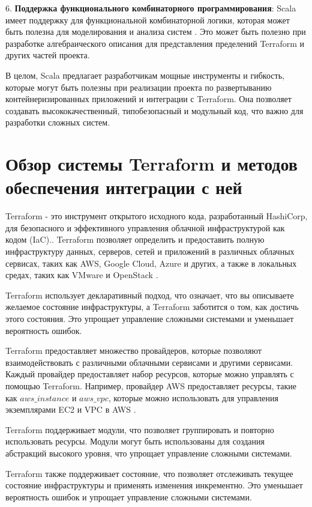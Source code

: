 6. \textbf{Поддержка функционального комбинаторного программирования}:
Scala имеет поддержку для функциональной комбинаторной логики, которая
может быть полезна для моделирования и анализа систем 
\cite{wolfengagen-combinatory-2008, wolfengagen-methods-2008}.
Это может быть полезно при разработке алгебраического описания для
представления пределений Terraform и других частей проекта.

В целом, Scala предлагает разработчикам мощные инструменты и гибкость,
которые могут быть полезны при реализации проекта по развертыванию
контейнеризированных приложений и интеграции с Terraform. Она позволяет
создавать высококачественный, типобезопасный и модульный код, что важно
для разработки сложных систем.

\section{Обзор системы Terraform и методов обеспечения интеграции с ней}

Terraform - это инструмент открытого исходного кода, разработанный HashiCorp,
для безопасного и эффективного управления облачной инфраструктурой как
кодом (IaC).\cite{jourdan2017infrastructure}. Terraform позволяет определить и
предоставить полную
инфраструктуру данных, серверов, сетей и приложений в различных облачных
сервисах, таких как AWS, Google Cloud, Azure и других, а также в локальных
средах, таких как VMware и OpenStack \cite{howard2022terraform}.

Terraform использует декларативный подход, что означает, что вы описываете
желаемое состояние инфраструктуры, а Terraform заботится о том, как достичь
этого состояния. Это упрощает управление сложными системами и уменьшает
вероятность ошибок.

Terraform предоставляет множество провайдеров, которые позволяют
взаимодействовать с различными облачными сервисами и другими сервисами.
Каждый провайдер предоставляет набор ресурсов, которые можно управлять
с помощью Terraform. Например, провайдер AWS предоставляет ресурсы,
такие как $aws\_instance$ и $aws\_vpc$, которые можно использовать для
управления экземплярами EC2 и VPC в AWS \cite{howard2022terraform}.

Terraform поддерживает модули, что позволяет группировать и повторно
использовать ресурсы. Модули могут быть использованы для создания
абстракций высокого уровня, что упрощает управление сложными системами.

Terraform также поддерживает состояние, что позволяет отслеживать
текущее состояние инфраструктуры и применять изменения инкрементно.
Это уменьшает вероятность ошибок и упрощает управление сложными системами.

